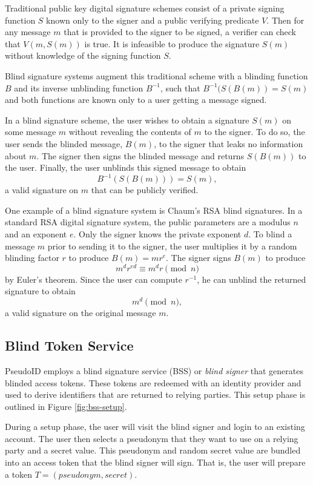 \documentclass[11pt]{llncs}
\begin{document}
Traditional public key digital signature schemes \cite{DH76} consist
of a private signing function $S$ known only to the signer and a
public verifying predicate $V$. Then for any message $m$ that is
provided to the signer to be signed, a verifier can check that $V(m,
S(m))$ is true. It is infeasible to produce the signature $S(m)$
without knowledge of the signing function $S$.

Blind signature systems \cite{Cha82} augment this traditional scheme
with a blinding function $B$ and its inverse unblinding function
$B^{-1}$, such that $B^{-1}(S(B(m)) = S(m)$ and both
functions are known only to a user getting a message signed.

In a blind signature scheme, the user wishes to obtain a signature
$S(m)$ on some message $m$ without revealing the contents of $m$ to
the signer. To do so, the user sends the blinded message, $B(m)$, to
the signer that leaks no information about $m$. The signer then signs
the blinded message and returns $S(B(m))$ to the user. Finally, the
user unblinds this signed message to obtain $$B^{-1}(S(B(m))) =
S(m),$$ a valid signature on $m$ that can be publicly verified.

One example of a blind signature system is Chaum's RSA blind
signatures. In a standard RSA digital signature system, the public
parameters are a modulus $n$ and an exponent $e$. Only the signer
knows the private exponent $d$. To blind a message $m$ prior to
sending it to the signer, the user multiplies it by a random blinding
factor $r$ to produce $B(m) = mr^e$. The signer signs $B(m)$ to
produce $$m^d r^{ed} \equiv m^d r \pmod n$$ by Euler's theorem. Since
the user can compute $r^{-1}$, he can unblind the returned signature
to obtain $$m^d \pmod n,$$ a valid signature on the original message
$m$.

\subsection{Blind Token Service}

PseudoID employs a blind signature service (BSS) or 
\emph{blind signer} that generates blinded access tokens. These tokens are
redeemed with an identity provider and used to derive identifiers that
are returned to relying parties. This setup phase is outlined in
Figure \ref{fig:bss-setup}.

During a setup phase, the user will visit the blind signer and login
to an existing account. The user then selects a pseudonym that they
want to use on a relying party and a secret value. This pseudonym and
random secret value are bundled into an access token that the blind
signer will sign. That is, the user will prepare a token $T =
(pseudonym, secret)$.
\end{document}
